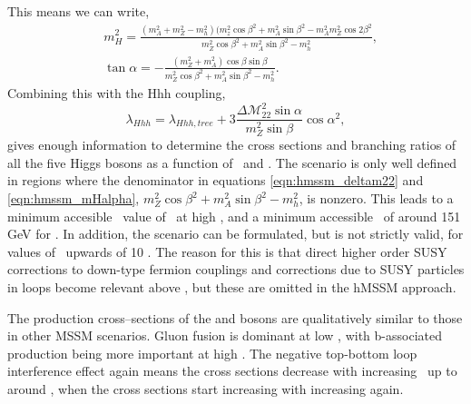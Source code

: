 This means we can write,
\begin{equation}
\label{eqn:hmssm_mHalpha}
\begin{split}
&m^2_H = \frac{(m_A^2+m_Z^2-m_h^2)(m_z^2\cos{\beta}^2+m_A^2\sin{\beta}^2 - m_A^2m_Z^2\cos{2\beta}^2}{m_Z^2\cos{\beta}^2+m_A^2\sin{\beta}^2-m_h^2},\\
&\tan{\alpha} = -\frac{(m_Z^2+m_A^2)\cos{\beta}\sin{\beta}}{m_Z^2\cos{\beta}^2+m_A^2\sin{\beta}^2-m_h^2}.
\end{split}
\end{equation}
Combining this with the Hhh coupling,
\begin{equation}
\label{eqn:hmssm_Hhh}
\lambda_{Hhh} = \lambda_{Hhh,tree} + 3\frac{\Delta\mathcal{M}^2_{22}\sin{\alpha}}{m_Z^2\sin{\beta}}\cos{\alpha}^2,
\end{equation}
gives enough information to determine the cross sections and branching
ratios of all the five Higgs bosons as a function of \mA~and \tanb. The scenario
is only well defined in regions where the denominator in equations
\ref{eqn:hmssm_deltam22} and \ref{eqn:hmssm_mHalpha}, $m_Z^2\cos{\beta}^2+m_A^2\sin{\beta}^2 - m_h^2$, is nonzero. 
This leads to a minimum accesible \mA~value of \mh~at high \tanb, and
a minimum accessible \mA~of around 151 GeV for . In addition, the scenario
can be formulated, but is not strictly valid, for values of \tanb~upwards of 10 \cite{CMS-PAS-HIG-16-007}.
The reason for this is that direct higher order SUSY corrections to down-type
fermion couplings and corrections due to SUSY particles in loops become relevant
above , but these are omitted in the hMSSM approach.


The production cross--sections of the \PHiggs and \PHiggsps bosons are
qualitatively similar to those in other MSSM scenarios. Gluon fusion is dominant
at low \tanb, with b-associated production being more important at high \tanb. The
negative top-bottom loop interference effect again means the cross sections decrease with increasing 
\tanb~up to around , when the cross sections start increasing with increasing \tanb again.

